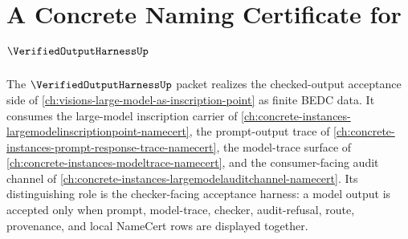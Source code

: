 \chapter{A Concrete Naming Certificate for $\VerifiedOutputHarnessUp$}
\label{ch:concrete-instances-verifiedoutputharness-namecert}

The $\VerifiedOutputHarnessUp$ packet realizes the checked-output acceptance side of \autoref{ch:visions-large-model-as-inscription-point} as finite BEDC data. It consumes the large-model inscription carrier of \autoref{ch:concrete-instances-largemodelinscriptionpoint-namecert}, the prompt-output trace of \autoref{ch:concrete-instances-prompt-response-trace-namecert}, the model-trace surface of \autoref{ch:concrete-instances-modeltrace-namecert}, and the consumer-facing audit channel of \autoref{ch:concrete-instances-largemodelauditchannel-namecert}. Its distinguishing role is the checker-facing acceptance harness: a model output is accepted only when prompt, model-trace, checker, audit-refusal, route, provenance, and local NameCert rows are displayed together.

